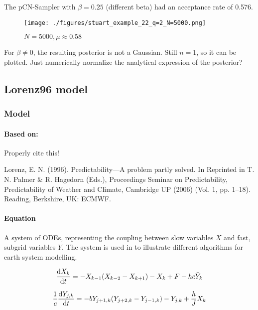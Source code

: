 \documentclass[11pt]{article}
\begin{document}
The pCN-Sampler with \(\beta = 0.25\) (different beta) had an acceptance rate of 0.576.

\begin{figure}[htbp]
\centering
\texttt{[image: ./figures/stuart\_example\_22\_q=2\_N=5000.png]}
\caption{\label{fig:stuart_22_density}
\(N=5000, \mu \approx 0.58\)}
\end{figure}

For \(\beta \neq 0\), the resulting posterior is not a Gaussian. Still \(n=1\), so it can be
plotted. Just numerically normalize the analytical expression of the posterior?

\subsection{Lorenz96 model}
\label{sec:org27400ec}
\subsubsection{Model}
\label{sec:org89edd4f}
\paragraph{Based on:}
\label{sec:org1324a76}

Properly cite this!


Lorenz, E. N. (1996). Predictability—A problem partly solved. In Reprinted in T. N. Palmer \& R. Hagedorn (Eds.), Proceedings Seminar on
Predictability, Predictability of Weather and Climate, Cambridge UP (2006) (Vol. 1, pp. 1–18). Reading, Berkshire, UK: ECMWF.

\paragraph{Equation}
\label{sec:org7080b1c}

A system of ODEs, representing the coupling between slow variables \(X\) and fast, subgrid
variables \(Y\). The system is used in \cite{schneider_earth_2017} to illustrate different
algorithms for earth system modelling.

\begin{equation}
\label{eqn:lorenz_X}
  \dv{X_k}{t} =                 - X_{k-1}(X_{k-2} - X_{k+1}) - X_k + F - hc \bar{Y}_k
\end{equation}

\begin{equation}
\label{eqn:lorenz_Y}
  \frac{1}{c} \dv{Y_{j,k}}{t} = -bY_{j+1,k}(Y_{j+2,k} - Y_{j-1, k}) - Y_{j,k} + \frac{h}{J}X_k
\end{equation}
\end{document}

